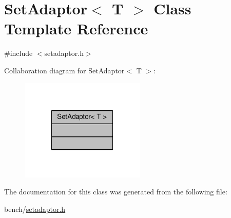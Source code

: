 \hypertarget{classSetAdaptor}{\section{Set\-Adaptor$<$ T $>$ Class Template Reference}
\label{classSetAdaptor}
}


{\ttfamily \#include $<$setadaptor.\-h$>$}



Collaboration diagram for Set\-Adaptor$<$ T $>$\-:
\nopagebreak
\begin{figure}[H]
\begin{center}
\leavevmode
\includegraphics[width=168pt]{classSetAdaptor__coll__graph}
\end{center}
\end{figure}


The documentation for this class was generated from the following file\-:\begin{DoxyCompactItemize}
\item 
bench/\hyperlink{setadaptor_8h}{setadaptor.\-h}\end{DoxyCompactItemize}
